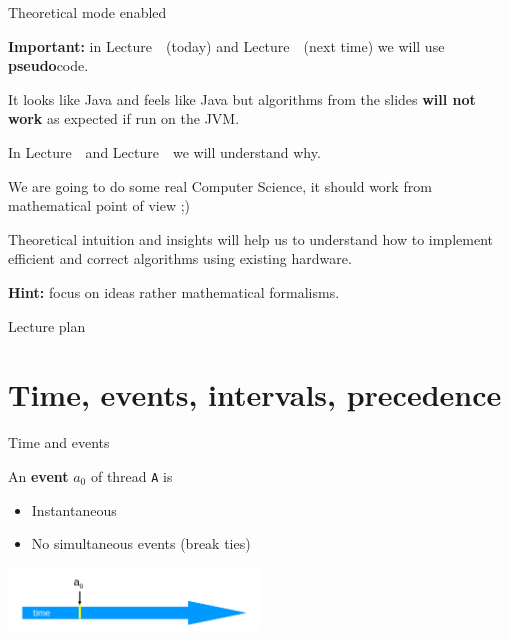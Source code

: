 \begin{frame}{Theoretical mode enabled}

\textbf{Important:} in Lecture~\foundationsNum \ (today) and Lecture~\foundationsPlusNum \ (next time) we will use \textbf{pseudo}code.

\pause

It looks like Java and feels like Java but algorithms from the slides \textbf{will not work} as expected if run on the JVM. 

\pause

In Lecture~\cacheCoherencyNum \ and Lecture~\langMMNum \ we will understand why.

\pause

We are going to do some real Computer Science, it should work from mathematical point of view ;)

\pause

Theoretical intuition and insights will help us to understand how to implement efficient and correct algorithms using existing hardware.

\pause

\textbf{Hint:} focus on ideas rather mathematical formalisms.

\end{frame}


\begin{frame}{Lecture plan}
\tableofcontents
\end{frame}

\section{Time, events, intervals, precedence}


\begin{frame}[fragile, t]{Time and events}

An \textbf{event} $a_0$ of thread \texttt{A} is
\begin{itemize}
  \item Instantaneous
  \item No simultaneous events (break ties)
\end{itemize}

\begin{center}
  \includegraphics[width=0.5\textwidth]{./pics/time/Timeline.png}
\end{center}

\end{frame}


